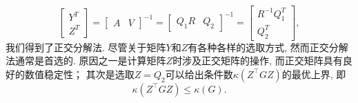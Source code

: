 \documentclass{SBCbookchapter}
\numberwithin{equation}{section}
\begin{document}
\begin{equation*}
\begin{bmatrix} Y^T \\ Z^T \end{bmatrix} = \begin{bmatrix} A & V \end{bmatrix}^{-1} = \begin{bmatrix} Q_1R & Q_2 \end{bmatrix}^{-1} = \begin{bmatrix} R^{-1} Q_1^T \\ Q_2^T \end{bmatrix},
\end{equation*}
我们得到了正交分解法. 尽管关于矩阵$Y$和$Z$有各种各样的选取方式, 然而正交分解法通常是首选的. 原因之一是计算矩阵$Z$时涉及正交矩阵的操作, 而正交矩阵具有良好的数值稳定性； 其次是选取$Z = Q_2$可以给出条件数$\kappa(Z^⊤ G Z)$的最优上界, 即
\begin{equation*}
\kappa(Z^⊤ G Z) \leqslant \kappa(G).
\end{equation*}
\end{document}
